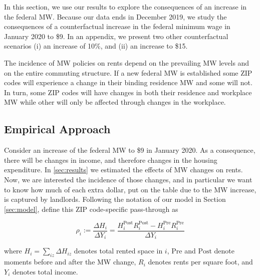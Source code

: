 
In this section, we use our results to explore the consequences of an increase
in the federal MW.
Because our data ends in December 2019, we study the consequences of a 
counterfactual increase in the federal minimum wage in January 2020 to \$9. 
In an appendix, we present two other counterfactual scenarios (i) an increase of 10\%, 
and (ii) an increase to \$15. 

The incidence of MW policies on rents depend on the prevailing MW levels and on
the entire commuting structure. If a new federal MW is established some ZIP 
codes will experience a change in their binding residence MW and some will not. In turn, 
some ZIP codes will have changes in both their residence and workplace MW while other 
will only be affected through changes in the workplace.



\subsection{Empirical Approach}\label{sec:emp_cf}

Consider an increase of the federal MW to \$9 in January 2020. As a consequence, there 
will be changes in income, and therefore changes in the housing expenditure.
In \ref{sec:results} we estimated the effects of MW changes on rents. Now, we are interested 
the incidence of those changes, and in particular we want to know how much of each extra 
dollar, put on the table due to the MW increase, is captured by landlords. Following the 
notation of our model in Section \ref{sec:model}, define this ZIP code-specific pass-through 
as

\begin{equation*}\label{eq:pass_through}
    \rho_i := \frac{\Delta H_i}{\Delta Y_i} 
            = \frac{H^{\text{Post}}_i R^{\text{Post}}_i - H^{\text{Pre}}_i R^{\text{Pre}}_i}{\Delta Y_i}
\end{equation*}

where $H_i = \sum_{iz}\Delta H_{iz}$ denotes total rented space in $i$, 
$\text{Pre}$ and $\text{Post}$ denote moments before and after the MW change,
$R_i$ denotes rents per square foot, and 
$Y_i$ denotes total income.

